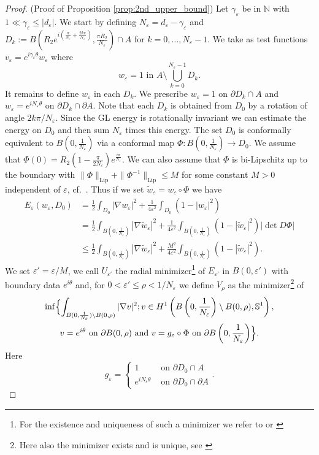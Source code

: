 \documentclass[12pt,reqno]{amsart}
\def\e {{\varepsilon}}
\def \p {\partial}
\numberwithin{equation}{section}
\begin{document}
\begin{proof}(Proof of Proposition \ref{prop:2nd_upper_bound})
Let \(\gamma_\e\) be in \(\mathbb{N}\) with \(1\ll\gamma_\e\leq |d_\e|\). We start by defining \(N_\e=d_\e-\gamma_\e\) and \( D_k:=B\left(R_2e^{i\left(\frac{\pi}{N_\e}+\frac{2k\pi}{N_\e}\right)},\frac{\pi R_2}{N_\e}\right)\cap A\) for \(k=0,\dots,N_\e-1\). We take as test functions \(v_\e=e^{i\gamma_\e \theta}w_\e\) where
\begin{equation*}
w_\e=1 \text{ in } A \setminus \bigcup_{k=0}^{N_\e-1} D_k.
\end{equation*}
It remains to define \(w_\e\) in each \(D_k\). We prescribe \(w_\e=1\) on \(\p D_k\cap A\) and \(w_\e=e^{iN_\e \theta}\) on \(\p D_k\cap \p A\). Note that each \(D_k\) is obtained from \(D_0\) by a rotation of angle \(2k\pi/N_\e\). Since the GL energy is rotationally invariant we can estimate the energy on \(D_0\) and then sum \(N_\e\) times this energy. The set \(D_0\) is conformally equivalent to \(B(0,\frac{1}{N_\e})\) via a conformal map \(\Phi: B(0,\frac{1}{N_\e})\rightarrow D_0\). We assume that  \(\Phi(0)=R_2(1-\frac{\pi}{2N_\e})e^{\frac{i\pi}{N_\e}}\). We can also assume that \(\Phi\) is  bi-Lipschitz up to the boundary with \(\|\Phi\|_{\text{Lip}}+\| \Phi^{-1}\|_{\text{Lip}}\leq M\) for some constant \(M>0\) independent of \(\e\), cf.\ \cite[Theorem 3.5]{Pommerenke_1992}. Thus if we set \(\tilde{w}_\e=w_\e\circ \Phi\) we have
\begin{align}
E_\e(w_\e,D_0)&=\frac12 \int_{D_0}|\nabla w_\e|^2 +\frac{1}{4\e^2}\int_{D_0} (1-|w_\e|^2) \nonumber \\
&= \frac12 \int_{B(0,\frac{1}{N_\e})}|\nabla \tilde{w}_\e|^2 +\frac{1}{4\e^2} \int_{B(0,\frac{1}{N_\e})} (1-|\tilde{w}_\e|^2)|\det D \Phi| \nonumber \\
& \leq \frac12 \int_{B(0,\frac{1}{N_\e})}|\nabla \tilde{w}_\e|^2 +\frac{M^2}{4\e^2} \int_{B(0,\frac{1}{N_\e})} (1-|\tilde{w}_\e|^2). \label{eq:Meps'}
\end{align}
We set \(\e'=\e/M\), we call \(U_{\e'}\) the radial minimizer\footnote{For the existence and uniqueness of such a minimizer we refer to \cite{Herve_Herve_1994} or \cite[Appendix II]{BBH}} of \( E_{\e'}\) in \(B(0,\e')\) with boundary data \(e^{i\theta}\) and, for \(0<\e'\leq \rho<1/N_\e\) we define \(V_{\rho}\) as the minimizer\footnote{Here also the minimizer exists and is unique, see \cite[Chapter 1]{BBH}} of
\begin{multline*}
\inf \Bigl\{ \int_{B(0,\frac{1}{N_\e})\setminus B(0,\rho)}|\nabla v|^2; v\in H^1\left(B\left(0,\frac{1}{N_\e}\right)\setminus B(0,\rho),\mathbb{S}^1\right), \\
v=e^{i\theta} \text{ on } \p B(0,\rho) \text{ and } v=g_\e\circ \Phi \text{ on } \p B\left(0,\frac{1}{N_\e}\right) \Bigr\}.
\end{multline*}
Here \[g_\e=\begin{cases}
1 & \text{ on } \p D_0 \cap A \\
e^{i N_\e \theta} & \text{ on } \p D_0 \cap \p A
\end{cases}.\]


\end{proof}
\end{document}
